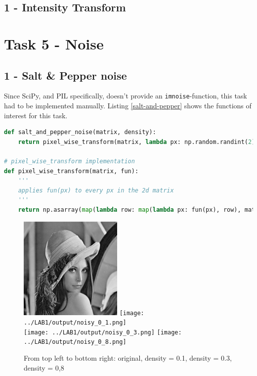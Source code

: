 \subsection*{1 - Intensity Transform}

%

\section*{Task 5 - Noise}

\subsection*{1 - Salt \& Pepper noise}

Since SciPy, and PIL specifically, doesn't provide an \texttt{imnoise}-function, this task had to be implemented manually. Listing \ref{salt-and-pepper} shows the functions of interest for this task.

\begin{lstlisting}[language=Python, label=salt-and-pepper, caption=Salt \& pepper noise]
def salt_and_pepper_noise(matrix, density):
    return pixel_wise_transform(matrix, lambda px: np.random.randint(2) if np.random.random() < density else px)

# pixel_wise_transform implementation
def pixel_wise_transform(matrix, fun):
    '''
    applies fun(px) to every px in the 2d matrix
    '''
    return np.asarray(map(lambda row: map(lambda px: fun(px), row), matrix))
\end{lstlisting}


\begin{figure}[h!]
    \centering
    \includegraphics[width=5cm]{../LAB1/img/lena.png}
    \texttt{[image: ../LAB1/output/noisy\_0\_1.png]} \\
    \texttt{[image: ../LAB1/output/noisy\_0\_3.png]}
    \texttt{[image: ../LAB1/output/noisy\_0\_8.png]}
    \caption{From top left to bottom right: original, density = 0.1, density = 0.3, density = 0,8}
\end{figure}
